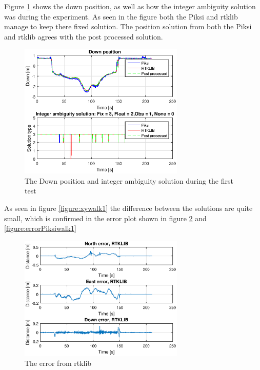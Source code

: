 Figure \ref{figure:DownAndAmbwalk1} shows the down position, as well as how the integer ambiguity solution was during the experiment. As seen in the figure both the Piksi and \gls{rtklib} manage to keep there fixed solution. The position solution from both the Piksi and \gls{rtklib} agrees with the post processed solution. 
\begin{figure}[H]
	\centering
		\includegraphics[width=0.7\textwidth]{figs/plots/downWalk1.eps}
		\caption{The Down position and integer ambiguity solution during the first test}
		\label{figure:DownAndAmbwalk1}
\end{figure}
As seen in figure \ref{figure:xywalk1} the difference between the solutions are quite small, which is confirmed in the error plot shown in figure \ref{figure:errorRTKwalk1} and \ref{figure:errorPiksiwalk1}
\begin{figure}[H]
	\centering
		\includegraphics[width=0.7\textwidth]{figs/plots/errorRtklibWalk1.eps}
		\caption{The error from \gls{rtklib}}
		\label{figure:errorRTKwalk1}
\end{figure}
